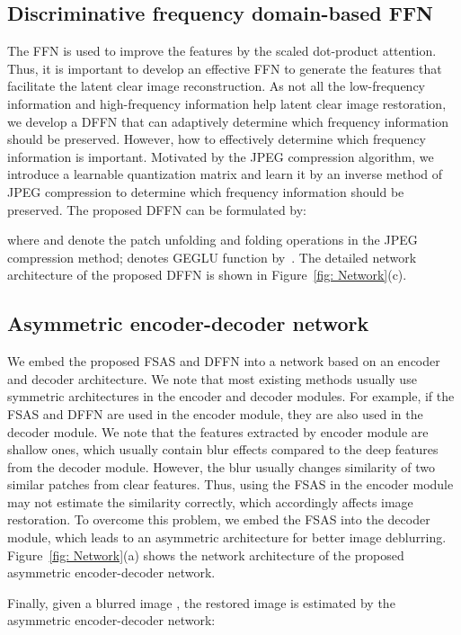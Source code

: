 \documentclass[10pt,twocolumn,letterpaper]{article}
\begin{document}
\subsection{Discriminative frequency domain-based FFN}
The FFN is used to improve the features by the scaled dot-product attention. Thus, it is important to develop an effective FFN to generate the features that facilitate the latent clear image reconstruction.
As not all the low-frequency information and high-frequency information help latent clear image restoration, we develop a DFFN that can adaptively determine which frequency information should be preserved.
However, how to effectively determine which frequency information is important. Motivated by the JPEG compression algorithm, we introduce a learnable quantization matrix  and learn it by an inverse method of JPEG compression to determine which frequency information should be preserved.
The proposed DFFN can be formulated by:

where  and  denote the patch unfolding and folding operations in the JPEG compression method;  denotes GEGLU function by~\cite{GLU}.
The detailed network architecture of the proposed DFFN is shown in Figure~\ref{fig: Network}(c).

\subsection{Asymmetric encoder-decoder network}
\label{section:Asymmetric encoder-decoder network}
We embed the proposed FSAS and DFFN into a network based on an encoder and decoder architecture.
We note that most existing methods usually use symmetric architectures in the encoder and decoder modules.
For example, if the FSAS and DFFN are used in the encoder module, they are also used in the decoder module.
We note that the features extracted by encoder module are shallow ones, which usually contain blur effects compared to the deep features from the decoder module.
However, the blur usually changes similarity of two similar patches from clear features. Thus, using the FSAS in the encoder module may not estimate the similarity correctly, which accordingly affects image restoration.
To overcome this problem, we embed the FSAS into the decoder module, which leads to an asymmetric architecture for better image deblurring.
Figure~\ref{fig: Network}(a) shows the network architecture of the proposed asymmetric encoder-decoder network.

Finally, given a blurred image , the restored image  is estimated by the asymmetric encoder-decoder network:
\end{document}

